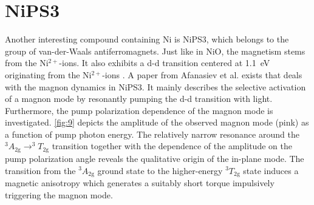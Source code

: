 \section{NiPS3}
Another interesting compound containing Ni is NiPS3, which belongs to the group of van-der-Waals antiferromagnets.
Just like in NiO, the magnetism stems from the Ni$^{2+}$-ions.
It also exhibits a d-d transition centered at \qty{1.1}{eV} originating from the Ni$^{2+}$-ions \cite{belvin_exciton-driven_2021}.
A paper from Afanasiev et al. \cite{afanasiev_controlling_2021} exists that deals with the magnon dynamics in NiPS3.
It mainly describes the selective activation of a magnon mode by resonantly pumping the d-d transition with light.
Furthermore, the pump polarization dependence of the magnon mode is investigated.
\autoref{fig:9} depicts the amplitude of the observed magnon mode (pink) as a function of pump photon energy.
The relatively narrow resonance around the $^3A_{2\text{g}} \rightarrow ^3T_{2\text{g}}$ transition together with the dependence of the amplitude on the pump polarization angle reveals the qualitative origin of the in-plane mode.
The transition from the $^3A_{2\text{g}}$ ground state to the higher-energy $^3T_{2\text{g}}$ state induces a magnetic anisotropy which generates a suitably short torque impulsively triggering the magnon mode.
